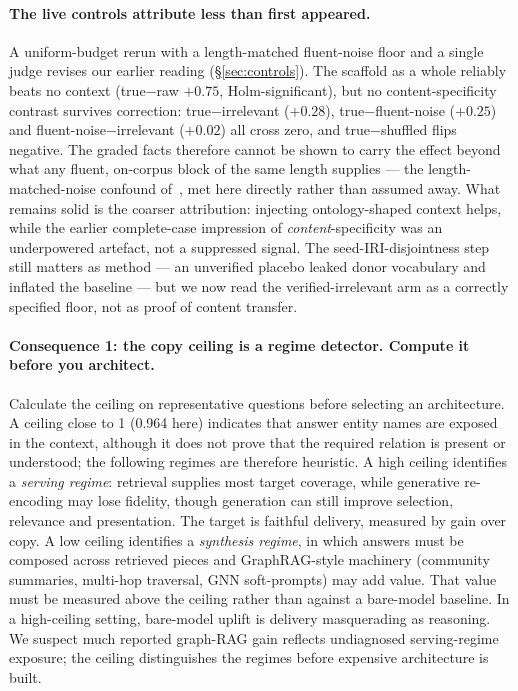 \documentclass[10pt,twocolumn]{article}
\begin{document}
\paragraph{The live controls attribute less than first appeared.} A uniform-budget rerun with a length-matched fluent-noise floor and a single judge revises our earlier reading (\S\ref{sec:controls}). The scaffold as a whole reliably beats no context (true$-$raw $+0.75$, Holm-significant), but no content-specificity contrast survives correction: true$-$irrelevant ($+0.28$), true$-$fluent-noise ($+0.25$) and fluent-noise$-$irrelevant ($+0.02$) all cross zero, and true$-$shuffled flips negative. The graded facts therefore cannot be shown to carry the effect beyond what any fluent, on-corpus block of the same length supplies --- the length-matched-noise confound of~\textcite{cuconasu2024poweofnoise}, met here directly rather than assumed away. What remains solid is the coarser attribution: injecting ontology-shaped context helps, while the earlier complete-case impression of \emph{content}-specificity was an underpowered artefact, not a suppressed signal. The seed-IRI-disjointness step still matters as method --- an unverified placebo leaked donor vocabulary and inflated the baseline --- but we now read the verified-irrelevant arm as a correctly specified floor, not as proof of content transfer.

\paragraph{Consequence 1: the copy ceiling is a regime detector. Compute it before you architect.}
Calculate the ceiling on representative questions before selecting an architecture. A ceiling close to 1 (0.964 here) indicates that answer entity names are exposed in the context, although it does not prove that the required relation is present or understood; the following regimes are therefore heuristic. A high ceiling identifies a \emph{serving regime}: retrieval supplies most target coverage, while generative re-encoding may lose fidelity, though generation can still improve selection, relevance and presentation. The target is faithful delivery, measured by gain over copy. A low ceiling identifies a \emph{synthesis regime}, in which answers must be composed across retrieved pieces and GraphRAG-style machinery (community summaries, multi-hop traversal, GNN soft-prompts) may add value. That value must be measured above the ceiling rather than against a bare-model baseline. In a high-ceiling setting, bare-model uplift is delivery masquerading as reasoning. We suspect much reported graph-RAG gain reflects undiagnosed serving-regime exposure; the ceiling distinguishes the regimes before expensive architecture is built.
\end{document}

